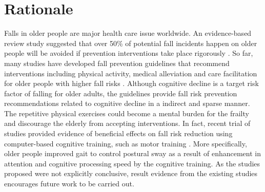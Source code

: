 \documentclass{article}
\begin{document}
\section{Rationale}
\begin{comment}
Aim: To explain why the research questions/aim(s) being addressed are important and why closely related questions are not being covered. 
This should include:
•	A clear explanation of the research question/aim(s) and the justification of the study i.e. why the question is worth asking and, through consultation with public and patient groups, why this is worthwhile to participants or wider service delivery.
•	A contextual framing of the research question/aim(s) in relation to relevant policy and historical and/or literature bases.
\end{comment}

Falls in older people are major health care issue worldwide. An evidence-based review study suggested that over 50\% of potential fall incidents happen on older people will be avoided if prevention interventions take place rigorously \cite{Kannus_2005}. So far, many studies have developed fall prevention guidelines that recommend interventions including physical activity, medical alleviation and care facilitation for older people with higher fall risks \cite{Jung_2014, PreventionofFalls2011,Church_2015}. Although cognitive decline is a target risk factor of falling for older adults, the guidelines provide fall risk prevention recommendations related to cognitive decline in a indirect and sparse manner. The repetitive physical exercises could become a mental burden for the frailty and discourage the elderly from accepting interventions. In fact, recent trial of studies provided evidence of beneficial effects on fall risk reduction using computer-based cognitive training, such as motor training \cite{van_het_Reve_2014, Barban_2017}. More specifically, older people improved gait to control postural sway as a result of enhancement in attention and cognitive processing speed by the cognitive training. As the studies proposed were not explicitly conclusive, result evidence from the existing studies encourages future work to be carried out. 
\end{document}
